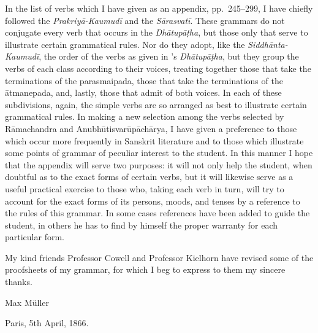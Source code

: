 In the list of verbs which I have given as an appendix, pp.\ 245–299, I
have chiefly followed the \emph{Prakriyā-Kaumudī} and the
\emph{Sārasvatī}. These grammars do not conjugate every verb that occurs
in the \emph{Dhātupāṭha}, but those only that serve to illustrate
certain grammatical rules. Nor do they adopt, like the
\emph{Siddhānta-Kaumudī}, the order of the verbs as given in \panini{}'s
\emph{Dhātupāṭha}, but they group the verbs of each class according to
their voices, treating together those that take the terminations of the
parasmaipada, those that take the terminations of the ātmanepada, and,
lastly, those that admit of both voices. In each of these subdivisions,
again, the simple verbs are so arranged as best to illustrate certain
grammatical rules. In making a new selection among the verbs selected by
Rāmachandra and Anubhūtisvarūpāchārya, I have given a preference to
those which occur more frequently in Sanskrit literature and to those
which illustrate some points of grammar of peculiar interest to the
student. In this manner I hope that the appendix will serve two
purposes: it will not only help the student, when doubtful as to the
exact forms of certain verbs, but it will likewise serve as a useful
practical exercise to those who, taking each verb in turn, will try to
account for the exact forms of its persons, moods, and tenses by a
reference to the rules of this grammar. In some cases references have
been added to guide the student, in others he has to find by himself the
proper warranty for each particular form.

My kind friends Professor Cowell and Professor Kielhorn have revised
some of the proofsheets of my grammar, for which I beg to express to
them my sincere thanks.

Max Müller

Paris, 5th April, 1866.
